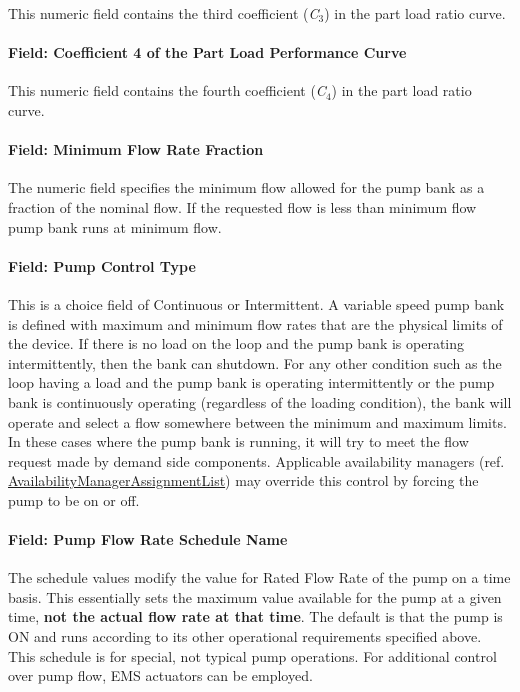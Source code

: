 This numeric field contains the third coefficient (\emph{C\(_{3}\)}) in the part load ratio curve.

\paragraph{Field: Coefficient 4 of the Part Load Performance Curve}\label{field-coefficient-4-of-the-part-load-performance-curve-2}

This numeric field contains the fourth coefficient (\emph{C\(_{4}\)}) in the part load ratio curve.

\paragraph{Field: Minimum Flow Rate Fraction}\label{field-minimum-flow-rate-fraction}

The numeric field specifies the minimum flow allowed for the pump bank as a fraction of the nominal flow. If the requested flow is less than minimum flow pump bank runs at minimum flow.

\paragraph{Field: Pump Control Type}\label{field-pump-control-type-3}

This is a choice field of Continuous or Intermittent. A variable speed pump bank is defined with maximum and minimum flow rates that are the physical limits of the device. If there is no load on the loop and the pump bank is operating intermittently, then the bank can shutdown. For any other condition such as the loop having a load and the pump bank is operating intermittently or the pump bank is continuously operating (regardless of the loading condition), the bank will operate and select a flow somewhere between the minimum and maximum limits. In these cases where the pump bank is running, it will try to meet the flow request made by demand side components. Applicable availability managers (ref. \hyperref[availabilitymanagerassignmentlist]{AvailabilityManagerAssignmentList}) may override this control by forcing the pump to be on or off.

\paragraph{Field: Pump Flow Rate Schedule Name}\label{field-pump-flow-rate-schedule-name-4}

The schedule values modify the value for Rated Flow Rate of the pump on a time basis. This essentially sets the maximum value available for the pump at a given time, \textbf{not the actual flow rate at that time}. The default is that the pump is ON and runs according to its other operational requirements specified above. This schedule is for special, not typical pump operations. For additional control over pump flow, EMS actuators can be employed.

